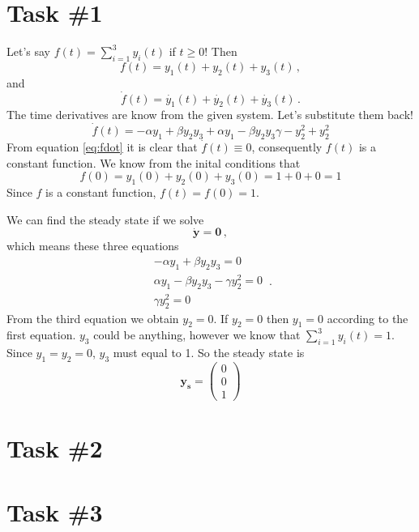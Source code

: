 \documentclass[12pt]{report}
\newcommand{\matr}[1]{\bm{#1}}
\begin{document}
	
	\section*{Task \#1}
	
	Let's say $f(t)=\sum_{i=1}^{3}y_i(t)$ if $t\geq 0$! Then 
	\begin{equation}
		f(t)=y_1(t)+y_2(t)+y_3(t)\,,
	\end{equation}
	and
	\begin{equation}
	\dot{f}(t)=\dot{y_1}(t)+\dot{y_2}(t)+\dot{y_3}(t)\,.
	\end{equation}
	The time derivatives are know from the given system. Let's substitute them back!
	\begin{equation}
	\dot{f}(t)=-\alpha y_1+\beta y_2y_3+\alpha y_1-\beta y_2y_3\gamma -y_{2}^2+y_{2}^2
	\label{eq:fdot}	
	\end{equation}
	From equation \ref{eq:fdot} it is clear that $\dot{f}(t)\equiv 0$, consequently $f(t)$ is a constant function. We know from the inital conditions that
	\begin{equation}
		f(0)=y_1(0)+y_2(0)+y_3(0)=1+0+0=1
	\end{equation}
	Since $f$ is a constant function, $f(t)=f(0)=1$.
	
	We can find the steady state if we solve
	\begin{equation}
		\matr{\dot{y}}=\matr{0} \,,
	\end{equation}
	which means these three equations
	\begin{equation}
		\begin{aligned}
		-\alpha y_1 + \beta y_2 y_3 = 0 \\
		\alpha y_1 - \beta y_2 y_3 - \gamma y_2^2 = 0 \\
		\gamma y_2^2 = 0
		\end{aligned} \,.
	\end{equation}
	From the third equation we obtain $y_2=0$. If $y_2=0$ then $y_1=0$ according to the first equation. $y_3$ could be anything, however we know that $\sum_{i=1}^{3}y_i(t)=1$. Since $y_1=y_2=0$, $y_3$ must equal to 1. So the steady state is
	$$
	\matr{y_s}=\begin{pmatrix}
		0 \\ 
		0\\ 
		1
	\end{pmatrix}
	$$

	\section*{Task \#2}
	
	
	\section*{Task \#3}
	
\end{document}
